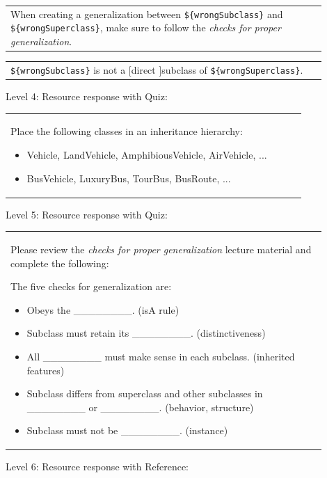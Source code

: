 \begin{tabular}{|p{0.9\linewidth}}
When creating a generalization between \verb|${wrongSubclass}| and \verb|${wrongSuperclass}|, make sure to follow the \textit{checks for proper generalization}.
\end{tabular} \medskip

\begin{tabular}{|p{0.9\linewidth}}
\verb|${wrongSubclass}| is not a [direct ]subclass of \verb|${wrongSuperclass}|.
\end{tabular} \medskip

\noindent Level 4: Resource response with Quiz: \medskip

\begin{tabular}{|p{0.9\linewidth}}
Place the following classes in an inheritance hierarchy:

\begin{itemize}
    \item Vehicle, LandVehicle, AmphibiousVehicle, AirVehicle, ...
    \item BusVehicle, LuxuryBus, TourBus, BusRoute, ...
\end{itemize}

\end{tabular} \medskip

\noindent Level 5: Resource response with Quiz: \medskip

\begin{tabular}{|p{0.9\linewidth}}
Please review the \textit{checks for proper generalization} lecture material
and complete the following:

The five checks for generalization are:
\begin{itemize}
    \item Obeys the \_\_\_\_\_\_\_\_. (isA rule)
    \item Subclass must retain its \_\_\_\_\_\_\_\_. (distinctiveness)
    \item All \_\_\_\_\_\_\_\_ must make sense in each subclass. (inherited features)
    \item Subclass differs from superclass and other subclasses in \_\_\_\_\_\_\_\_ or \_\_\_\_\_\_\_\_. (behavior, structure)
    \item Subclass must not be \_\_\_\_\_\_\_\_. (instance)
\end{itemize}

\end{tabular} \medskip

\noindent Level 6: Resource response with Reference: \medskip

